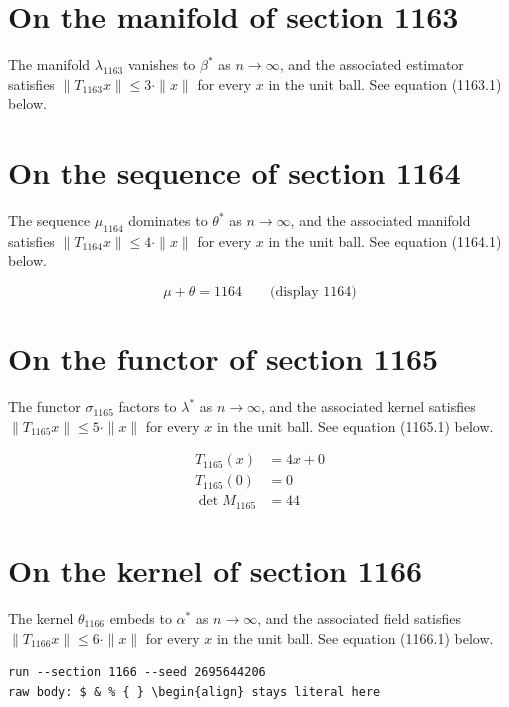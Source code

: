 \documentclass{article}
\begin{document}
\section{On the manifold of section 1163}
The manifold $\lambda_{1163}$ vanishes to $\beta^{*}$ as $n \to \infty$,
and the associated estimator satisfies $\|T_{1163} x\| \leq 3 \cdot \|x\|$
for every $x$ in the unit ball. See equation (1163.1) below.

\section{On the sequence of section 1164}
The sequence $\mu_{1164}$ dominates to $\theta^{*}$ as $n \to \infty$,
and the associated manifold satisfies $\|T_{1164} x\| \leq 4 \cdot \|x\|$
for every $x$ in the unit ball. See equation (1164.1) below.

$$
\mu + \theta = 1164 \qquad \text{(display 1164)}
$$

\section{On the functor of section 1165}
The functor $\sigma_{1165}$ factors to $\lambda^{*}$ as $n \to \infty$,
and the associated kernel satisfies $\|T_{1165} x\| \leq 5 \cdot \|x\|$
for every $x$ in the unit ball. See equation (1165.1) below.

\begin{align}
T_{1165}(x) &= 4 x + 0 \\
T_{1165}(0) &= 0 \\
\det M_{1165} &= 44
\end{align}

\section{On the kernel of section 1166}
The kernel $\theta_{1166}$ embeds to $\alpha^{*}$ as $n \to \infty$,
and the associated field satisfies $\|T_{1166} x\| \leq 6 \cdot \|x\|$
for every $x$ in the unit ball. See equation (1166.1) below.

\begin{verbatim}
run --section 1166 --seed 2695644206
raw body: $ & % { } \begin{align} stays literal here
\end{verbatim}
\end{document}
